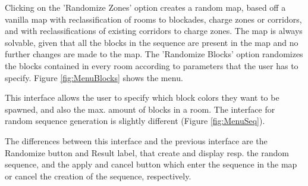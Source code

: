 Clicking on the 'Randomize Zones' option creates a random map, based off a vanilla map with reclassification of rooms to blockades, charge zones or corridors, and with reclassifications of existing corridors to charge zones. The map is always solvable, given that all the blocks in the sequence are present in the map and no further changes are made to the map. The 'Randomize Blocks' option randomizes the blocks contained in every room according to parameters that the user has to specify. Figure 	\ref{fig:MenuBlocks} shows the menu.

This interface allows the user to specify which block colors they want to be spawned, and also the max. amount of blocks in a room. The interface for random sequence generation is slightly different (Figure \ref{fig:MenuSeq}).



The differences between this interface and the previous interface are the Randomize button and Result label, that  create and display resp. the random sequence, and the apply and cancel button which enter the sequence in the map or cancel the creation of the sequence, respectively.


